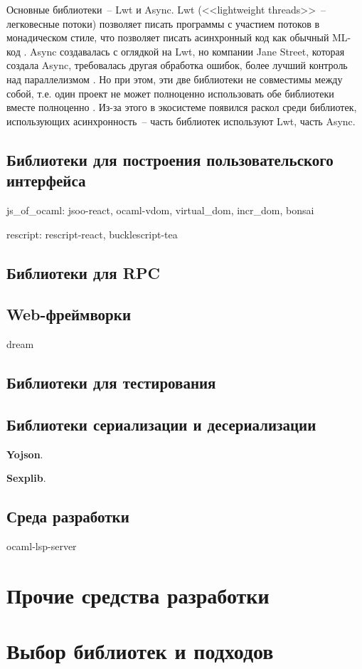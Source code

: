 Основные библиотеки~-- Lwt и Async. Lwt (<<lightweight threads>>~-- легковесные потоки)
позволяет писать программы с участием потоков в монадическом стиле, что позволяет писать
асинхронный код как обычный ML-код \cite{vouillon-lwt}. Async создавалась с оглядкой на Lwt, 
но компании Jane Street, которая создала Async, требовалась другая обработка ошибок, 
более лучший контроль над параллелизмом \cite{announcing-async}. Но при этом, эти две библиотеки
не совместимы между собой, т.е. один проект не может полноценно использовать обе библиотеки 
вместе полноценно \cite{rgrinberg-async}. Из-за этого в экосистеме появился раскол среди библиотек,
использующих асинхронность~-- часть библиотек используют Lwt, часть Async. 

\subsection{Библиотеки для построения пользовательского интерфейса}

\TODO

js\_of\_ocaml: jsoo-react, ocaml-vdom, virtual\_dom, incr\_dom, bonsai

rescript: rescript-react, bucklescript-tea

\subsection{Библиотеки для RPC}

\TODO

\subsection{Web-фреймворки}

dream  \TODO

\subsection{Библиотеки для тестирования}

\TODO

\subsection{Библиотеки сериализации и десериализации}

\TODO

\textbf{Yojson}.

\textbf{Sexplib}.

\subsection{Среда разработки}

ocaml-lsp-server

\section{Прочие средства разработки}

\section{Выбор библиотек и подходов}

\TODO
